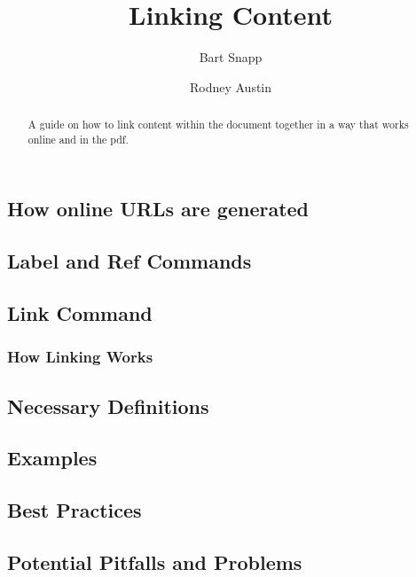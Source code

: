 \documentclass{ximera}
\author{Bart Snapp \and Rodney Austin}
\title{Linking Content}
\begin{document}
\begin{abstract}
  A guide on how to link content within the document together in a way that works online and in the pdf.
\end{abstract}
\maketitle

    \subsection*{How online URLs are generated}
        
        
        
    \subsection*{Label and Ref Commands}
        
        
        
    \subsection*{Link Command}
        
        
        
        \subsubsection*{How Linking Works}
            
            
            
    \subsection*{Necessary Definitions}
        
        
        
    \subsection*{Examples}
        
        
        
    \subsection*{Best Practices}
        
        
        
    \subsection*{Potential Pitfalls and Problems}
        
        
        
        
\end{document}
